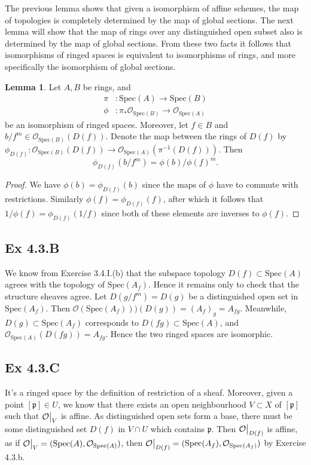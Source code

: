 \documentclass{article}
\newcommand\restr[2]{{%
  \left.\kern-\nulldelimiterspace %
  #1 %
  \vphantom{\big|} %
  \right|_{#2} %
  }}
\theoremstyle{definition}
\newtheorem{lemma}[theorem]{Lemma}
\newcommand{\oo}{\mathcal{O}}
\newcommand{\osp}[1]{\oo_{\Spec\left(#1\right)}}
\newcommand{\Spec}{\text{Spec}}
\begin{document}
The previous lemma shows that given a isomorphism of affine schemes, the map of
topologies is completely determined by the map of global sections. The next
lemma will show that the map of rings over any distinguished open subset also
is determined by the map of global sections. From these two facts it follows
that isomorphisms of ringed spaces is equivalent to isomorphisms of rings, and
more specifically the isomorphism of global sections.

\begin{lemma}
	Let $A, B$ be rings, and
	\begin{align*}
		\pi  & : \Spec(A) \to \Spec(B)    \\
		\phi & : \pi_*\osp{B} \to \osp{A}
	\end{align*}
	be an isomorphism of ringed spaces. Moreover, let $f \in B$ and $b/f^m \in
		\osp{B}(D(f))$. Denote the map between the rings of $D(f)$ by $\phi_{D(f)}
		: \osp{B}(D(f)) \to \osp{A}(\pi^{-1}(D(f)))$. Then
	\[
		\phi_{D(f)}(b/f^m)
		=
		\phi(b)/\phi(f)^m.
	\]
\end{lemma}
\begin{proof}
	We have $\phi(b) = \phi_{D(f)}(b)$ since the maps of $\phi$ have to commute
	with restrictions. Similarly $\phi(f) = \phi_{D(f)}(f)$, after which it
	follows that $1/\phi(f) = \phi_{D(f)}(1/f)$ since both of these elements
	are inverses to $\phi(f)$.
\end{proof}


\subsection*{Ex 4.3.B}

We know from Exercise 3.4.I.(b) that the subspace topology $D(f) \subset
	\Spec(A)$ agrees with the topology of $\Spec(A_f)$. Hence it remains only to
check that the structure sheaves agree. Let $D(g/f^m) = D(g)$ be a
distinguished open set in $\Spec(A_f)$. Then $\mathcal{O}(\Spec(A_f)))(D(g)) =
	(A_f)_{g} = A_{fg}$. Meanwhile, $D(g)  \subset \Spec(A_f)$ corresponds to
$D(fg) \subset \Spec(A)$, and $\mathcal{O}_{\Spec(A)}(D(fg)) = A_{fg}$. Hence
the two ringed spaces are isomorphic.

\subsection*{Ex 4.3.C}

It's a ringed space by the definition of restriction of a sheaf. Moreover,
given a point $[\mathfrak{p}] \in U$, we know that there exists an open
neighbourhood $V \subset X$ of $[\mathfrak{p}]$ such that
$\restr{\mathcal{O}}{V}$ is affine. As distinguished open sets form a base,
there must be some distinguished set $D(f)$ in $V \cap U$ which contains
$\mathfrak{p}$. Then $\restr{\mathcal{O}}{D(f)}$ is affine, as if
$\restr{\mathcal{O}}{V} = (\Spec(A), \mathcal{O}_{\Spec(A)})$, then
$\restr{\mathcal{O}}{D(f)} = (\Spec(A_f), \mathcal{O}_{\Spec(A_f)})$ by
Exercise 4.3.b.
\end{document}
